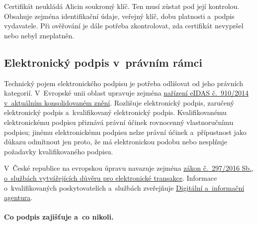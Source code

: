 Certifikát neukládá Alicin soukromý klíč. Ten musí zůstat pod její kontrolou. Obsahuje zejména identifikační údaje, veřejný klíč, dobu platnosti a~podpis vydavatele. Při ověřování je dále potřeba zkontrolovat, zda certifikát nevypršel nebo nebyl zneplatněn.


\subsection{Elektronický podpis v~právním rámci}

Technický pojem elektronického podpisu je potřeba odlišovat od jeho právních kategorií. V~Evropské unii oblast upravuje zejména \href{https://eur-lex.europa.eu/legal-content/CS/TXT/?uri=CELEX:02014R0910-20241018}{nařízení eIDAS č.~910/2014 v~aktuálním konsolidovaném znění}. Rozlišuje elektronický podpis, zaručený elektronický podpis a~kvalifikovaný elektronický podpis. Kvalifikovanému elektronickému podpisu přiznává právní účinek rovnocenný vlastnoručnímu podpisu; jinému elektronickému podpisu nelze právní účinek a~přípustnost jako důkazu odmítnout jen proto, že má elektronickou podobu nebo nesplňuje požadavky kvalifikovaného podpisu.

V~České republice na evropskou úpravu navazuje zejména \href{https://www.e-sbirka.cz/sb/2016/297}{zákon č.~297/2016 Sb., o~službách vytvářejících důvěru pro elektronické transakce}. Informace o~kvalifikovaných poskytovatelích a~službách zveřejňuje \href{https://www.dia.gov.cz/cs/legislativa/eidas-sluzby-vytvarejici-duveru-a-elektronicka-identifikace/povinne-zverejnovane-informace/seznam-kvalifikovanych-poskytovatelu-sluzeb-vytvarejicich-duveru-a-poskytovanych-kvalifikovanych-sluzeb-vytvarejicich-duveru}{Digitální a~informační agentura}.


\paragraph{Co podpis zajišťuje a~co nikoli.}

